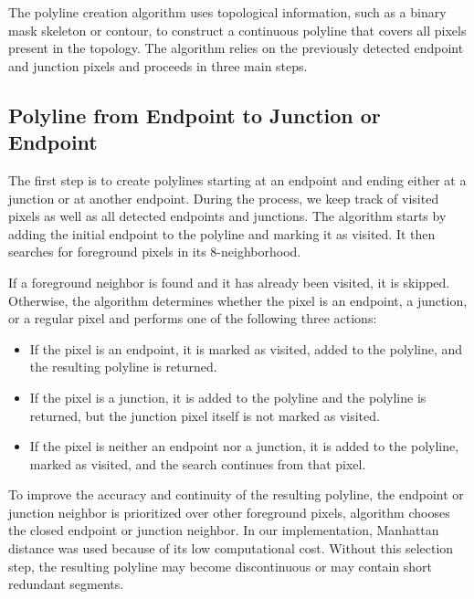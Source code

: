 The polyline creation algorithm uses topological information, such as a binary mask skeleton or contour, to construct a continuous polyline that covers all pixels present in the topology. The algorithm relies on the previously detected endpoint and junction pixels and proceeds in three main steps.

\subsection{Polyline from Endpoint to Junction or Endpoint}

The first step is to create polylines starting at an endpoint and ending either at a junction or at another endpoint. During the process, we keep track of visited pixels as well as all detected endpoints and junctions. The algorithm starts by adding the initial endpoint to the polyline and marking it as visited. It then searches for foreground pixels in its 8-neighborhood. 

If a foreground neighbor is found and it has already been visited, it is skipped. Otherwise, the algorithm determines whether the pixel is an endpoint, a junction, or a regular pixel and performs one of the following three actions:

\begin{itemize}
	\item If the pixel is an endpoint, it is marked as visited, added to the polyline, and the resulting polyline is returned.
	\item If the pixel is a junction, it is added to the polyline and the polyline is returned, but the junction pixel itself is not marked as visited.
	\item If the pixel is neither an endpoint nor a junction, it is added to the polyline, marked as visited, and the search continues from that pixel.
\end{itemize}

To improve the accuracy and continuity of the resulting polyline, the endpoint or junction neighbor is prioritized over other foreground pixels, algorithm chooses the closed endpoint or junction neighbor. In our implementation, Manhattan distance was used because of its low computational cost. Without this selection step, the resulting polyline may become discontinuous or may contain short redundant segments.


